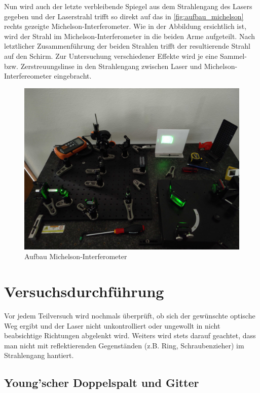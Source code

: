 \documentclass[ngerman]{scrartcl}
\begin{document}
Nun wird auch der letzte verbleibende Spiegel aus dem Strahlengang des Lasers gegeben und der Laserstrahl trifft so direkt auf das in \autoref{fig:aufbau_michelson} rechts gezeigte Michelson-Interferometer. Wie in der Abbildung ersichtlich ist, wird der Strahl im Michelson-Interferometer in die beiden Arme aufgeteilt. Nach letztlicher Zusammenführung der beiden Strahlen trifft der resultierende Strahl auf den Schirm.
Zur Untersuchung verschiedener Effekte wird je eine Sammel- bzw. Zerstreuungslinse in den Strahlengang zwischen Laser und Michelson-Interfereometer eingebracht.
%
\begin{figure}[H]
    \centering
    \begin{samepage}
        \includegraphics[width=0.7\linewidth]{fig/Compressed/aufbau_michelson.jpg}
        \caption{Aufbau Michelson-Interferometer}
        \label{fig:aufbau_michelson}
    \end{samepage}
\end{figure}


\newpage
\section{Versuchsdurchführung}
\label{sec:durchfuehrung}

Vor jedem Teilversuch wird nochmals überprüft, ob sich der gewünschte optische Weg ergibt und der Laser nicht unkontrolliert oder ungewollt in nicht beabsichtige Richtungen abgelenkt wird. Weiters wird stets darauf geachtet, dass man nicht mit reflektierenden Gegenständen (z.B. Ring, Schraubenzieher) im Strahlengang hantiert.

\subsection{Young'scher Doppelspalt und Gitter}
\label{sec:durchfuehrung_doppelspalt_gitter}
\end{document}
